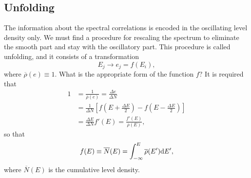 \documentclass[a4paper,11pt,twoside]{article}
\begin{document}
    \subsection{Unfolding}\label{sec:Unfolding}
        The information about the spectral correlations is encoded in the oscillating level density only.
        We must find a procedure for rescaling the spectrum to eliminate the smooth part and stay with the oscillatory part.
        This procedure is called unfolding, and it consists of a transformation
        \begin{equation}
            E_{j}\longrightarrow e_{j}=f(E_{i}),
        \end{equation}
        where  $\overline{\rho}(e)\equiv1$.
        What is the appropriate form of the function $f$?
        It is required that
        \begin{align}
            1&=\frac{1}{\overline{\rho}(e)}=\frac{\Delta e}{\Delta N}\nonumber\\
                &=\frac{1}{\Delta N}\left[f\left(E+\frac{\Delta E}{2}\right)-f\left(E-\frac{\Delta E}{2}\right)\right]\nonumber\\
                &=\frac{\Delta E}{\Delta N}f'(E)=\frac{f'(E)}{\overline{\rho}(E)},
        \end{align}
        so that
        \begin{equation}
            \label{eq:SmoothN}
            f(E)\equiv\overline{N}(E)=\int_{-\infty}^{E}\overline{\rho}(E')\mathrm{d} E',
        \end{equation}
        where $\overline{N}(E)$ is the cumulative level density.
        
\end{document}
